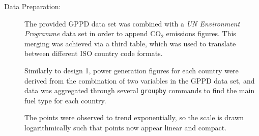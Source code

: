 \begin{description}
\item[Data Preparation:]
The provided GPPD data set was combined with a \textit{UN Environment Programme} data set in order to append CO$_2$ emissions figures. This merging was achieved via a third table, which was used to translate between different ISO country code formats.

Similarly to design 1, power generation figures for each country were derived from the combination of two variables in the GPPD data set, and data was aggregated through several \texttt{groupby} commands to find the main fuel type for each country.

The points were observed to trend exponentially, so the scale is drawn logarithmically such that points now appear linear and compact.

\end{description}

